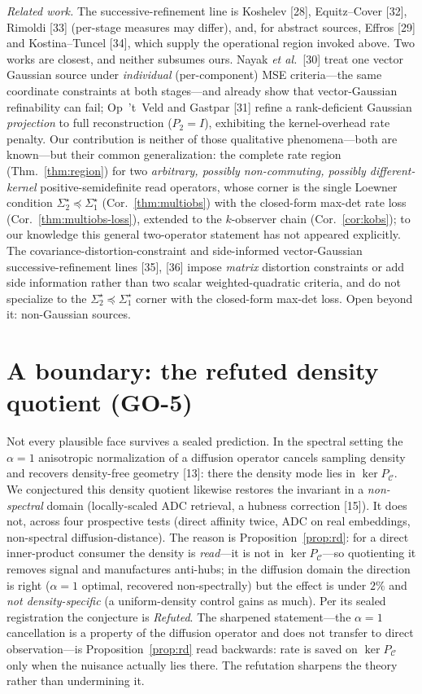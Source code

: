 \documentclass[lettersize,onecolumn]{IEEEtran}
\theoremstyle{definition}
\theoremstyle{remark}
\newcommand{\PC}{P_{\mathcal{C}}}
\begin{document}
\emph{Related work.} The successive-refinement line is Koshelev [28],
Equitz--Cover [32], Rimoldi [33] (per-stage measures may
differ), and, for abstract sources, Effros [29] and Kostina--Tuncel
[34], which supply the operational region invoked above. Two works are
closest, and neither subsumes ours. Nayak \emph{et al.}~[30] treat one
vector Gaussian source under \emph{individual} (per-component) MSE criteria---the same
coordinate constraints at both stages---and already show that vector-Gaussian
refinability can fail; Op~'t~Veld and Gastpar [31] refine a rank-deficient
Gaussian \emph{projection} to full reconstruction ($P_2=I$), exhibiting the
kernel-overhead rate penalty. Our contribution is neither of those qualitative
phenomena---both are known---but their common generalization: the complete rate region
(Thm.~\ref{thm:region}) for two \emph{arbitrary, possibly non-commuting, possibly
different-kernel} positive-semidefinite read operators, whose corner is the single Loewner
condition $\Sigma_2^\star\preceq\Sigma_1^\star$ (Cor.~\ref{thm:multiobs}) with the
closed-form max-det rate loss (Cor.~\ref{thm:multiobs-loss}), extended to the $k$-observer
chain (Cor.~\ref{cor:kobs}); to our knowledge this general two-operator statement has not
appeared explicitly. The covariance-distortion-constraint and side-informed vector-Gaussian
successive-refinement lines [35], [36] impose \emph{matrix} distortion constraints
or add side information rather than two scalar weighted-quadratic criteria, and do not
specialize to the $\Sigma_2^\star\preceq\Sigma_1^\star$ corner with the closed-form max-det
loss. Open beyond it: non-Gaussian sources.

\section{A boundary: the refuted density quotient (GO-5)}\label{sec:boundary}

Not every plausible face survives a sealed prediction. In the spectral setting the
$\alpha{=}1$ anisotropic normalization of a diffusion operator cancels sampling
density and recovers density-free geometry [13]: there the density mode
lies in $\ker\PC$. We conjectured this density quotient likewise restores the
invariant in a \emph{non-spectral} domain (locally-scaled ADC retrieval, a hubness
correction [15]). It does not, across four prospective tests
(direct affinity twice, ADC on real embeddings, non-spectral diffusion-distance).
The reason is Proposition~\ref{prop:rd}: for a direct inner-product consumer the
density is \emph{read}---it is not in $\ker\PC$---so quotienting it removes signal and
manufactures anti-hubs; in the diffusion domain the direction is right ($\alpha{=}1$
optimal, recovered non-spectrally) but the effect is under $2\%$ and \emph{not
density-specific} (a uniform-density control gains as much). Per its sealed
registration the conjecture is \emph{Refuted}. The sharpened statement---the
$\alpha{=}1$ cancellation is a property of the diffusion operator and does not
transfer to direct observation---is Proposition~\ref{prop:rd} read backwards: rate is
saved on $\ker\PC$ only when the nuisance actually lies there. The refutation
sharpens the theory rather than undermining it.
\end{document}
